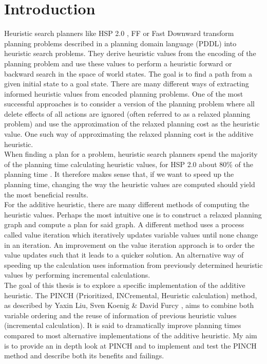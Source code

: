 \chapter{Introduction}
{\small
Heuristic search planners like HSP 2.0 \cite{hsp2}, FF \cite{ff} or Fast Downward \cite{fast} transform planning problems described in a planning domain language (PDDL) into heuristic search problems. They derive heuristic values from the encoding of the planning problem and use these values to perform a heuristic forward or backward search in the space of world states. The goal is to find a path from a given initial state to a goal state. There are many different ways of extracting informed heuristic values from encoded planning problems. One of the most successful approaches is to consider a version of the planning problem where all delete effects of all actions are ignored (often referred to as a relaxed planning problem) and use the approximation of the relaxed planning cost as the heuristic value. One such way of approximating the relaxed planning cost is the additive heuristic. \\

When finding a plan for a problem, heuristic search planners spend the majority of the planning time calculating heuristic values, for HSP 2.0 about 80\% of the planning time \cite{bonet}. It therefore makes sense that, if we want to speed up the planning time, changing the way the heuristic values are computed should yield the most beneficial results. \\

For the additive heuristic, there are many different methods of computing the heuristic values. Perhaps the most intuitive one is to construct a relaxed planning graph and compute a plan for said graph. A different method uses a process called value iteration which iteratively updates variable values until none change in an iteration. An improvement on the value iteration approach is to order the value updates such that it leads to a quicker solution. An alternative way of speeding up the calculation uses information from previously determined heuristic values by performing incremental calculations.  \\

The goal of this thesis is to explore a specific implementation of the additive heuristic. The PINCH (Prioritized, INCremental, Heuristic calculation) method, as described by Yaxin Liu, Sven Koenig \& David Furcy \cite{main}, aims to combine both variable ordering and the reuse of information of previous heuristic values (incremental calculation). It is said to dramatically improve planning times compared to most alternative implementations of the additive heuristic\cite{main}. My aim is to provide an in depth look at PINCH and to implement and test the PINCH method and describe both its benefits and failings.}